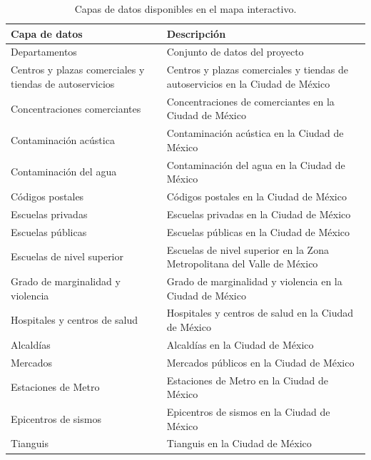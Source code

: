 \begin{table}[H]
    \centering
    \begin{tabular}{|p{}|p{}|}
    \hline
    \rowcolor{azulclaro}
    \textbf{Capa de datos} & \textbf{Descripción} \\ \hline
    Departamentos & Conjunto de datos del proyecto \\ \hline
    Centros y plazas comerciales y tiendas de autoservicios \cite{cdmx_centros_comerciales} & Centros y plazas comerciales y tiendas de autoservicios en la Ciudad de México \\ \hline
    Concentraciones comerciantes \cite{cdmx_concentraciones_comerciantes} & Concentraciones de comerciantes en la Ciudad de México \\ \hline
    Contaminación acústica \cite{cdmx_contaminacion_acustica} & Contaminación acústica en la Ciudad de México \\ \hline
    Contaminación del agua \cite{cdmx_contaminacion_agua} & Contaminación del agua en la Ciudad de México  \\ \hline
    Códigos postales \cite{cdmx_codigos_postales} & Códigos postales en la Ciudad de México  \\ \hline
    Escuelas privadas \cite{cdmx_escuelas_privadas} & Escuelas privadas en la Ciudad de México  \\ \hline
    Escuelas públicas \cite{cdmx_escuelas_publicas} & Escuelas públicas en la Ciudad de México  \\ \hline
    Escuelas de nivel superior \cite{cdmx_escuelas_superior} & Escuelas de nivel superior en la Zona Metropolitana del Valle de México  \\ \hline
    Grado de marginalidad y violencia \cite{cdmx_marginalidad_violencia} & Grado de marginalidad y violencia en la Ciudad de México  \\ \hline
    Hospitales y centros de salud \cite{cdmx_hospitales_salud} & Hospitales y centros de salud en la Ciudad de México  \\ \hline
    Alcaldías \cite{cdmx_alcaldias} & Alcaldías en la Ciudad de México \\ \hline
    Mercados \cite{cdmx_mercados_publicos} & Mercados públicos en la Ciudad de México  \\ \hline
    Estaciones de Metro \cite{cdmx_lineas_metro} & Estaciones de Metro en la Ciudad de México \\ \hline
    Epicentros de sismos \cite{cdmx_sismos} & Epicentros de sismos en la Ciudad de México \\ \hline
    Tianguis \cite{cdmx_tianguis} & Tianguis en la Ciudad de México  \\ \hline
    \end{tabular}
    \caption{Capas de datos disponibles en el mapa interactivo.}
    \label{tab:capas-datos}
\end{table}

